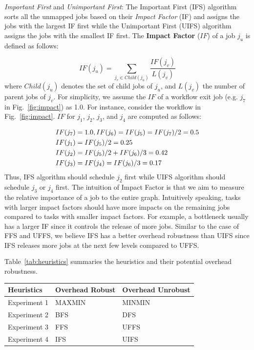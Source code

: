 \documentclass[final]{IEEEtran}
\begin{document}
\emph{Important First} and \emph{Unimportant First}: The Important First (IFS) algorithm sorts all the unmapped jobs based on their \emph{Impact Factor} (IF) and assigns the jobs with the largest IF first while the Unimportant First (UIFS) algorithm assigns the jobs with the smallest IF first. 
The \textbf{Impact Factor} ($IF$) of a job $j_u$ is defined as follows:

\begin{equation}
	IF(j_u)=\sum_{j_v\in Child(j_u)}^{}\frac{IF(j_v)}{L(j_v)}
\end{equation}
where $Child(j_u)$ denotes the set of child jobs of $j_u$, and $L(j_v)$ the number of parent jobs of $j_v$. For simplicity, we assume the $IF$ of a workflow exit job (e.g. $j_7$ in Fig.~\ref{fig:impact}) as 1.0. For instance, consider the workflow in Fig.~\ref{fig:impact}. $IF$ for $j_1$, $j_2$, $j_3$, and $j_4$ are computed as follows:

\begin{eqnarray}
	\displaystyle  
	&IF(j_7 )=1.0, IF(j_6 )=IF(j_5 )=IF(j_7 )/2=0.5\nonumber  \\
	&IF(j_1 )=IF(j_5)/2=0.25\nonumber \\
	&IF(j_2 )=IF(j_5 )/2+IF(j_6)/3=0.42\nonumber \\
	&IF(j_3 )=IF(j_4 )=IF(j_6 )/3=0.17\nonumber 
\end{eqnarray}
Thus, IFS algorithm should schedule $j_2$ first while UIFS algorithm should schedule $j_3$ or $j_4$ first. The intuition of Impact Factor is that we aim to measure the relative importance of a job to the entire graph. Intuitively speaking, tasks with larger impact factors should have more impacts on the remaining jobs compared to tasks with smaller impact factors. For example, a bottleneck usually has a larger IF since it controls the release of more jobs. 
Similar to the case of FFS and UFFS, we believe IFS has a better overhead robustness than UIFS since IFS releases more jobs at the next few levels compared to UFFS. 


Table~\ref{tab:heuristics} summaries the heuristics and their potential overhead robustness. 

\begin{center}
  \begin{tabular}{ l|l|l}
    \hline
Heuristics & Overhead Robust & Overhead Unrobust \\ \hline
    Experiment 1 & MAXMIN & MINMIN \\ \hline
   Experiment 2 & BFS & DFS \\ \hline
 Experiment 3 & FFS & UFFS \\ \hline
Experiment 4 & IFS & UIFS\\
    \hline
  \end{tabular}
\label{tab:heuristics}
\end{center}
\end{document}
